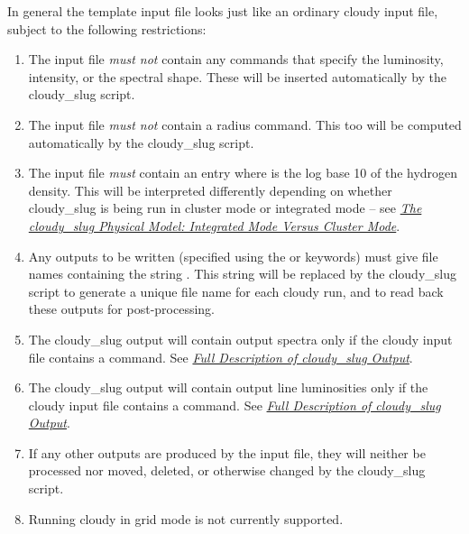 \documentclass[letterpaper,10pt,english]{sphinxmanual}
\begin{document}
In general the template input file looks just like an ordinary cloudy
input file, subject to the following restrictions:
\begin{enumerate}
\item {} 
The input file \emph{must not} contain any commands that specify the
luminosity, intensity, or the spectral shape. These will be
inserted automatically by the cloudy\_slug script.

\item {} 
The input file \emph{must not} contain a radius command. This too will
be computed automatically by the cloudy\_slug script.

\item {} 
The input file \emph{must} contain an entry  where  is
the log base 10 of the hydrogen density. This will be interpreted
differently depending on whether cloudy\_slug is being run in
cluster mode or integrated mode -- see {\hyperref[cloudy:ssec\string-cloudy\string-cluster]{\emph{The cloudy\_slug Physical Model: Integrated Mode Versus Cluster Mode}}}.

\item {} 
Any outputs to be written (specified using the  or
 keywords) must give file names containing the string
. This string will be replaced by the
cloudy\_slug script to generate a unique file name for each cloudy
run, and to read back these outputs for post-processing.

\item {} 
The cloudy\_slug output will contain output spectra only if the
cloudy input file contains a  command. See
{\hyperref[cloudy:ssec\string-cloudy\string-output]{\emph{Full Description of cloudy\_slug Output}}}.

\item {} 
The cloudy\_slug output will contain output line luminosities only
if the cloudy input file contains a  command. See {\hyperref[cloudy:ssec\string-cloudy\string-output]{\emph{Full Description of cloudy\_slug Output}}}.

\item {} 
If any other outputs are produced by the input file, they will
neither be processed nor moved, deleted, or otherwise changed by
the cloudy\_slug script.

\item {} 
Running cloudy in grid mode is not currently supported.

\end{enumerate}
\end{document}
